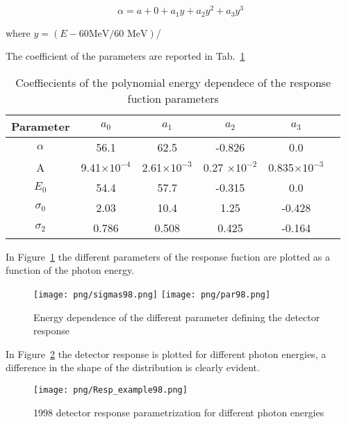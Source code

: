 \begin{equation}
\alpha= a+0+a_1y+a_2y^2+a_3y^3
\end{equation}

where $y= (E-60 \text{MeV}/60 \text{ MeV})$/


The  coefficient of the parameters are reported in Tab.~\ref{tab:param98}
\begin{table}[!h]
\begin{center}
\begin{tabular}{| c | c | c | c | c | c | }
\hline
Parameter & $a_0$ & $a_1$ & $a_2$ & $a_3$ \\ \hline
$\alpha$ & 56.1 &62.5 & -0.826 & 0.0  \\ \hline
A & 9.41$\times 10^{-4}$ & 2.61$\times 10^{-3}$ &0.27 $\times 10^{-2}$ &0.835$\times 10^{-3}$   \\ \hline
$E_0$ & 54.4 & 57.7 & -0.315 &0.0 \\ \hline
$\sigma_0$ & 2.03 &10.4 &1.25 & -0.428\\ \hline
$\sigma_2$ & 0.786 & 0.508 & 0.425 & -0.164\\ \hline

\end{tabular}
\end{center}
\caption{Coeffiecients of the polynomial energy dependece of the response fuction parameters\label{tab:param98}}
\end{table}

In Figure~\ref{fig:parameters98} the different parameters of the response fuction are plotted as a function of the photon energy.


\begin{figure}[!h]
 \begin{center}
 \texttt{[image: png/sigmas98.png]} 
 \texttt{[image: png/par98.png]} 
 \end{center}
 \caption{Energy dependence of the different parameter defining the detector response}
 \label{fig:parameters98}
 \end{figure}

In  Figure~\ref{fig:response98} the detector response is plotted for different photon energies, a difference in the shape of the distribution is clearly evident.

\begin{figure}[!h]
\centering
\texttt{[image: png/Resp\_example98.png]}
\caption{1998 detector response parametrization for different photon energies}
\label{fig:response98}
\end{figure}



